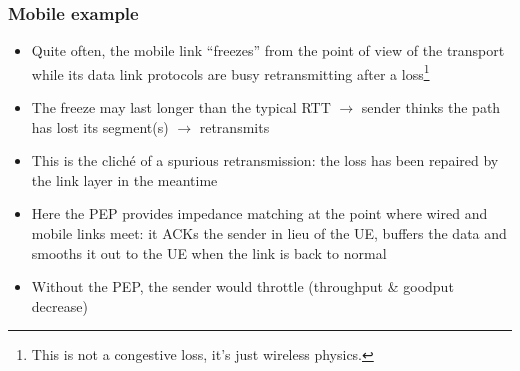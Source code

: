\begin{frame}
  \frametitle{Mobile example}
  \begin{itemize}
    \item Quite often, the mobile link ``freezes'' from the point of view of the transport while its data link protocols are busy retransmitting after a loss\footnote{This is not a congestive loss, it's just wireless physics.}
    \item The freeze may last longer than the typical RTT $\rightarrow$ sender thinks the path has lost its segment(s) $\rightarrow$ retransmits
    \item This is the clich\'e of a spurious retransmission: the loss has been repaired by the link layer in the meantime
    \item Here the PEP provides impedance matching at the point where wired and mobile links meet: it ACKs the sender in lieu of the UE, buffers the data and smooths it out to the UE when the link is back to normal
    \item Without the PEP, the sender would throttle (throughput \& goodput decrease)
  \end{itemize}
\end{frame}
